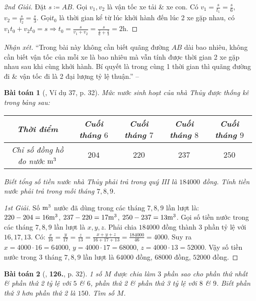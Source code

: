 \documentclass{article}
\numberwithin{equation}{section}
\newtheorem{baitoan}{Bài toán}
\begin{document}
\begin{proof}[2nd Giải]
	Đặt $s\coloneqq AB$. Gọi $v_1,v_2$ là vận tốc xe tải \& xe con. Có $v_1 = \frac{s}{t_1} = \frac{s}{6}$, $v_2 = \frac{s}{t_2} = \frac{s}{3}$. Gọi$t_0$ là thời gian kể từ lúc khởi hành đến lúc 2 xe gặp nhau, có $v_1t_0 + v_2t_0 = s\Rightarrow t_0 = \frac{s}{v_1 + v_2} = \frac{s}{\frac{s}{6} + \frac{s}{3}} = 2$h.
\end{proof}
\noindent\textit{Nhận xét.} ``Trong bài này không cần biết quãng đường $AB$ dài bao nhiêu, không cần biết vận tốc của mỗi xe là bao nhiêu mà vẫn tính được thời gian 2 xe gặp nhau sau khi cùng khởi hành. Bí quyết là trong cùng 1 thời gian thì quãng đường đi \& vận tốc đi là 2 đại lượng tỷ lệ thuận.'' -- \cite[p. 31]{Tuyen_Toan_7}

\begin{baitoan}[\cite{Tuyen_Toan_7}, Ví dụ 37, p. 32]
	Mức nước sinh hoạt của nhà Thủy được thống kê trong bảng sau:
	
	\begin{table}[H]
		\centering
		\begin{tabular}{|c|c|c|c|c|}
			\hline
			Thời điểm & Cuối tháng $6$ & Cuối tháng $7$ & Cuối tháng $8$ & Cuối tháng $9$ \\
			\hline
			Chỉ số đồng hồ đo nước $\rm m^3$ & $204$ & $220$ & $237$ & $250$ \\
			\hline
		\end{tabular}
	\end{table}
	Biết tổng số tiền nước nhà Thủy phải trả trong quý III là $184000$ đồng. Tính tiền nước phải trả trong mỗi tháng $7,8,9$.
\end{baitoan}

\begin{proof}[1st Giải]
	Số $\rm m^3$ nước đã dùng trong các tháng $7,8,9$ lần lượt là: $220 - 204 = 16\rm m^3$, $237 - 220 = 17\rm m^3$, $250 - 237 = 13\rm m^3$. Gọi số tiền nước trong các tháng $7,8,9$ lần lượt là $x,y,z$. Phải chia $184000$ đồng thành 3 phần tỷ lệ với $16,17,13$. Có: $\frac{x}{16} = \frac{y}{17} = \frac{z}{13} = \frac{x + y + z}{16 + 17 + 13} = \frac{184000}{46} = 4000$. Suy ra $x = 4000\cdot16 = 64000$, $y = 4000\cdot17 = 68000$, $z = 4000\cdot13 = 52000$. Vậy số tiền nước trong 3 tháng $7,8,9$ lần lượt là $64000$ đồng, $68000$ đồng, $52000$ đồng.
\end{proof}

\begin{baitoan}[\cite{Tuyen_Toan_7}, \textbf{126.}, p. 32]
	1 số $M$ được chia làm $3$ phần sao cho phần thứ nhất \& phần thứ 2 tỷ lệ với $5$ \& $6$, phần thứ 2 \& phần thứ 3 tỷ lệ với $8$ \& $9$. Biết phần thứ 3 hơn phần thứ 2 là $150$. Tìm số $M$.
\end{baitoan}
	
\end{document}
